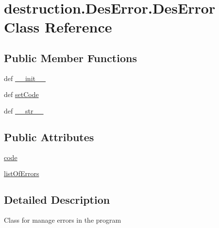 \hypertarget{classdestruction_1_1_des_error_1_1_des_error}{\section{destruction.\-Des\-Error.\-Des\-Error Class Reference}
\label{classdestruction_1_1_des_error_1_1_des_error}
}
\subsection*{Public Member Functions}
\begin{DoxyCompactItemize}
\item 
def \hyperlink{classdestruction_1_1_des_error_1_1_des_error_a0dde47764ac07a2b0199cbc3c6c3e076}{\-\_\-\-\_\-init\-\_\-\-\_\-}
\item 
def \hyperlink{classdestruction_1_1_des_error_1_1_des_error_afb59722fd5dfcc769ea577f6db278194}{set\-Code}
\item 
def \hyperlink{classdestruction_1_1_des_error_1_1_des_error_a0070acc6a0c30cc793127f2e2a9fe6ca}{\-\_\-\-\_\-str\-\_\-\-\_\-}
\end{DoxyCompactItemize}
\subsection*{Public Attributes}
\begin{DoxyCompactItemize}
\item 
\hyperlink{classdestruction_1_1_des_error_1_1_des_error_a5d58c4eee2db20e1ebd7b920e5b7a2cd}{code}
\item 
\hyperlink{classdestruction_1_1_des_error_1_1_des_error_a5c19a71b305265034b23a8bc9509518c}{list\-Of\-Errors}
\end{DoxyCompactItemize}


\subsection{Detailed Description}
\begin{DoxyVerb}Class for manage errors in the program
\end{DoxyVerb}
 

